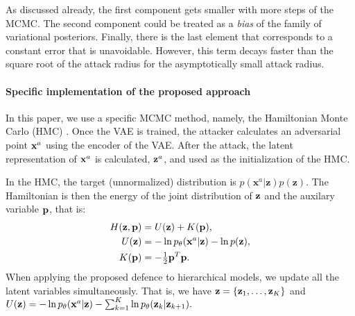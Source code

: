As discussed already, the first component gets smaller with more steps of the MCMC. %
The second component could be treated as a \textit{bias} of the family of variational posteriors. Finally, there is the last element that corresponds to a constant error that is unavoidable. However, this term decays faster than the square root of the attack radius for the asymptotically small attack radius.

\paragraph{Specific implementation of the proposed approach}
In this paper, we use a specific MCMC method, namely, the Hamiltonian Monte Carlo (HMC) \cite{betancourt2017conceptual, duane1987hybrid}. Once the VAE is trained, the attacker calculates an adversarial point ${\mathbf{x}}^a$ using the encoder of the VAE. After the attack, the latent representation of ${\mathbf{x}}^a$ is calculated, ${\mathbf{z}}^a$, and used as the initialization of the HMC.

In the HMC, the target (unnormalized) distribution is $p(\mathbf{x}^{a}|\mathbf{z}) p(\mathbf{z})$. The Hamiltonian is then the energy of the joint distribution of ${\mathbf{z}}$ and the auxilary variable ${\mathbf{p}}$, that is:
\begin{align}
    H({\mathbf{z}}, {\mathbf{p}}) &= U({\mathbf{z}}) + K({\mathbf{p}}),\\
    U({\mathbf{z}}) &= - \ln p_{\theta}(\mathbf{x}^{a}|\mathbf{z}) - \ln p(\mathbf{z}),\\
    K({\mathbf{p}}) &= -\tfrac12 {\mathbf{p}}^T{\mathbf{p}}.
\end{align}
When applying the proposed defence to hierarchical models, we update all the latent variables simultaneously. That is, we have ${\mathbf{z}} = \{ {\mathbf{z}}_1, \dots, {\mathbf{z}}_K\}$ and
$U({\mathbf{z}}) = -\ln {p_{\theta}({\mathbf{x}}^a|{\mathbf{z}})} - \sum_{k=1}^K\ln p_{\theta}({\mathbf{z}}_k|{\mathbf{z}}_{k+1}). $


